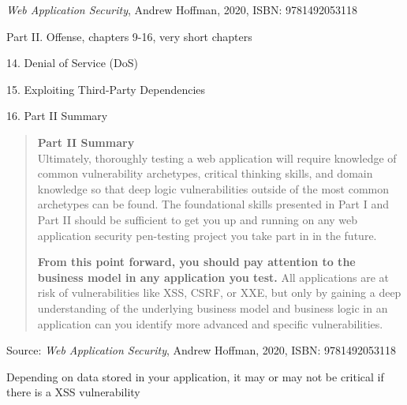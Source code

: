 \documentclass[Screen16to9,17pt]{foils}
\begin{document}

\emph{Web Application Security}, Andrew Hoffman, 2020, ISBN: 9781492053118

\begin{list1}
\item Part II. Offense, chapters 9-16, very short chapters
\item 14. Denial of Service (DoS)
\item 15. Exploiting Third-Party Dependencies
\item 16. Part II Summary
\end{list1}



\begin{quote}
{\bf Part II Summary}\\

Ultimately, thoroughly testing a web application will require knowledge of common vulnerability archetypes, critical thinking skills, and domain knowledge so that deep logic vulnerabilities outside of the most common archetypes can be found. The foundational skills presented in Part I and Part II should be sufficient to get you up and running on any web application security pen-testing project you take part in in the future.

{\bf From this point forward, you should pay attention to the business model in any application you test.} All applications are at risk of vulnerabilities like XSS, CSRF, or XXE, but only by gaining a deep understanding of the underlying business model and business logic in an application can you identify more advanced and specific
vulnerabilities.
\end{quote}
Source: \emph{Web Application Security}, Andrew Hoffman, 2020, ISBN: 9781492053118


\begin{list2}
\item Depending on data stored in your application, it may or may not be critical if there is a XSS vulnerability
\end{list2}


\end{document}
